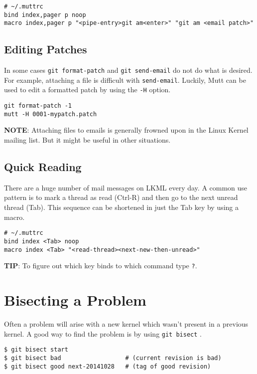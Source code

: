 \documentclass{article}
\begin{document}
\begin{verbatim}
# ~/.muttrc
bind index,pager p noop
macro index,pager p "<pipe-entry>git am<enter>" "git am <email patch>"
\end{verbatim}

\subsection{Editing Patches}

In some cases \verb+git format-patch+ and \verb+git send-email+ do not do what is
desired.  For example, attaching a file is difficult with \verb+send-email+.
Luckily, Mutt can be used to edit a formatted patch by using the \verb+-H+
option.

\begin{verbatim}
git format-patch -1
mutt -H 0001-mypatch.patch
\end{verbatim}

\textbf{NOTE}: Attaching files to emails is generally frowned upon in the
Linux Kernel mailing list. But it might be useful in other situations.

\subsection{Quick Reading}

There are a huge number of mail messages on LKML every day.  A common
use pattern is to mark a thread as read (Ctrl-R) and then go to the next
unread thread (Tab).  This sequence can be shortened in just the Tab key
by using a macro.

\begin{verbatim}
# ~/.muttrc
bind index <Tab> noop
macro index <Tab> "<read-thread><next-new-then-unread>"
\end{verbatim}

\textbf{TIP}: To figure out which key binds to which command type \verb+?+.

\section{Bisecting a Problem}

Often a problem will arise with a new kernel which wasn't present in a
previous kernel.  A good way to find the problem is by using
\verb+git bisect+ \autocite{debug-with-git}.

\begin{verbatim}
$ git bisect start
$ git bisect bad                  # (current revision is bad)
$ git bisect good next-20141028   # (tag of good revision)
\end{verbatim}
\end{document}
